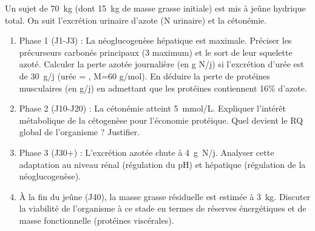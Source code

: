 \documentclass[11pt]{article}
\begin{document}
\begin{exercice}
Un sujet de \SI{70}{kg} (dont \SI{15}{kg} de masse grasse initiale) est mis à jeûne hydrique total. On suit l'excrétion urinaire d'azote (N urinaire) et la cétonémie.
\begin{enumerate}
    \item Phase 1 (J1-J3) : La néoglucogenèse hépatique est maximale. Préciser les précurseurs carbonés principaux (3 maximum) et le sort de leur squelette azoté. Calculer la perte azotée journalière (en g N/j) si l'excrétion d'urée est de \SI{30}{g/j} (urée = , M=60 g/mol). En déduire la perte de protéines musculaires (en g/j) en admettant que les protéines contiennent 16\% d'azote.
    \item Phase 2 (J10-J20) : La cétonémie atteint \SI{5}{mmol/L}. Expliquer l'intérêt métabolique de la cétogenèse pour l'économie protéique. Quel devient le RQ global de l'organisme ? Justifier.
    \item Phase 3 (J30+) : L'excrétion azotée chute à \SI{4}{g N/j}. Analyser cette adaptation au niveau rénal (régulation du pH) et hépatique (régulation de la néoglucogenèse).
    \item À la fin du jeûne (J40), la masse grasse résiduelle est estimée à \SI{3}{kg}. Discuter la viabilité de l'organisme à ce stade en termes de réserves énergétiques et de masse fonctionnelle (protéines viscérales).
\end{enumerate}
\end{exercice}
\end{document}
